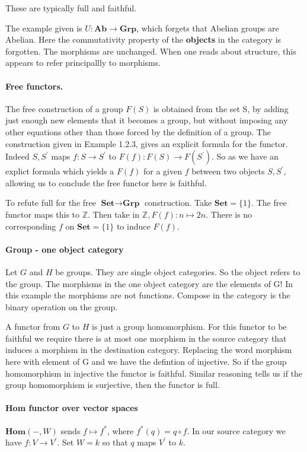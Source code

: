 \documentclass{article}
\begin{document}
These are typically full and faithful.

The example given is $U:\textbf{Ab} \rightarrow \textbf{Grp}$, which forgets that Abelian groups are Abelian. Here the commutativity property of the \textbf{objects} in the category is forgotten. The morphisms are unchanged. When one reads about structure, this appears to refer principallly to morphisms.

\paragraph{Free functors.}

The free construction of a group $F(S)$ is obtained from the set S, by adding just enough new elements that it becomes a group, but without imposing any other equations other than those forced by the definition of a group. The construction given in Example 1.2.3, gives an explicit formula for the functor. Indeed $S, S^\prime$ maps $f\colon S \rightarrow S^\prime$ to $F(f)\colon F(S) \rightarrow F(S^\prime)$. So as we have an explict formula which yields a $F(f)$ for a given $f$ between two objects $S, S^\prime$, allowing us to conclude the free functor here is faithful.

To refute full for the free $\textbf{Set} \rightarrow \textbf{Grp}$ construction. Take $\mathbf{Set}=\{ 1 \}$. The free functor maps this to $\mathds{Z}$. Then take in $\mathds{Z}, F(f)\colon n \mapsto 2n$. There is no corresponding $f$ on $\mathbf{Set}=\{ 1 \}$ to induce $F(f)$.

\paragraph{Group - one object category}

Let $G$ and $H$ be groups. They are single object categories. So the object refers to the group. The morphisms in the one object category are the elements of G! In this example the morphisms are not functions. Compose in the category is the binary operation on the group.

A functor from $G$ to $H$ is just a group homomorphism. For this functor to be faithful we require there is at most one morphism in the source category that induces a morphism in the destination category. Replacing the word morphism here with element of G and we have the defintion of injective. So if the group homomorphism in injective the functor is faithful. Similar reasoning tells us if the group homomorphism is surjective, then the functor is full.

\paragraph{Hom functor over vector spaces}

$\mathbf{Hom}(-,W)$ sends $f \mapsto f^*$, where $ f^*(q) = q \circ f$. In our source category we have $f\colon V \rightarrow V^\prime$. Set $W=k$ so that $q$ maps $V^\prime$ to $k$.
\end{document}
